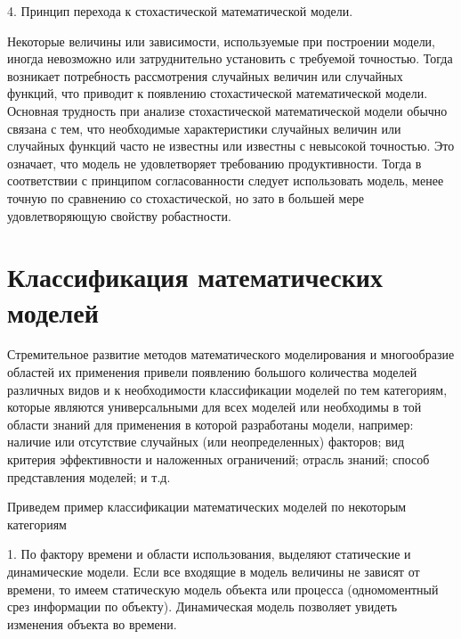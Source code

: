 4. Принцип перехода к стохастической математической модели.

Некоторые величины или зависимости, используемые при построении модели, иногда невозможно или затруднительно установить с требуемой точностью. Тогда возникает потребность рассмотрения случайных величин или случайных функций, что приводит к появлению стохастической математической модели.
Основная трудность при анализе стохастической математической модели обычно связана с тем, что необходимые характеристики случайных величин или случайных функций часто не известны или известны с невысокой точностью. Это означает, что модель не удовлетворяет требованию продуктивности. Тогда в соответствии с принципом согласованности следует использовать модель, менее точную по сравнению со стохастической, но зато в большей мере удовлетворяющую свойству робастности.


\section{ Классификация математических моделей}


Стремительное развитие методов математического моделирования и многообразие областей их применения привели появлению большого количества моделей различных видов и к необходимости классификации моделей по тем категориям, которые являются универсальными для всех моделей или необходимы в той области знаний для применения в которой разработаны модели, например: наличие или отсутствие случайных (или неопределенных) факторов; вид критерия эффективности и наложенных ограничений; отрасль знаний; способ представления моделей; и т.д.


Приведем пример классификации математических моделей по некоторым категориям


1. По фактору времени и области использования, выделяют статические и динамические модели. Если все входящие в модель величины не зависят от времени, то имеем статическую модель объекта или процесса (одномоментный срез информации по объекту). Динамическая модель позволяет увидеть изменения объекта во времени.


